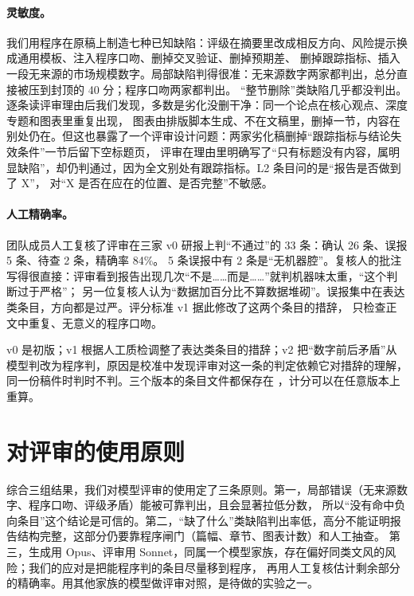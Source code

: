 \paragraph{灵敏度。}我们用程序在原稿上制造七种已知缺陷：评级在摘要里改成相反方向、风险提示换成通用模板、注入程序口吻、删掉交叉验证、删掉预期差、
删掉跟踪指标、插入一段无来源的市场规模数字。局部缺陷判得很准：无来源数字两家都判出，总分直接被压到封顶的 40 分；程序口吻两家都判出。
“整节删除”类缺陷几乎都没判出。逐条读评审理由后我们发现，多数是劣化没删干净：同一个论点在核心观点、深度专题和图表里重复出现，
图表由排版脚本生成、不在文稿里，删掉一节，内容在别处仍在。但这也暴露了一个评审设计问题：两家劣化稿删掉“跟踪指标与结论失效条件”一节后留下空标题页，
评审在理由里明确写了“只有标题没有内容，属明显缺陷”，却仍判通过，因为全文别处有跟踪指标。L2 条目问的是“报告是否做到了 X”，
对“X 是否在应在的位置、是否完整”不敏感。

\paragraph{人工精确率。}团队成员人工复核了评审在三家 v0 研报上判“不通过”的 33 条：确认 26 条、误报 5 条、待查 2 条，精确率 84\%。
5 条误报中有 2 条是“无机器腔”。复核人的批注写得很直接：评审看到报告出现几次“不是……而是……”就判机器味太重，“这个判断过于严格”；
另一位复核人认为“数据加百分比不算数据堆砌”。误报集中在表达类条目，方向都是过严。评分标准 v1 据此修改了这两个条目的措辞，
只检查正文中重复、无意义的程序口吻。

\begin{note}[评分标准的版本]
v0 是初版；v1 根据人工质检调整了表达类条目的措辞；v2 把“数字前后矛盾”从模型判改为程序判，原因是校准中发现评审对这一条的判定依赖它对措辞的理解，
同一份稿件时判时不判。三个版本的条目文件都保存在 ，计分可以在任意版本上重算。
\end{note}

\section{对评审的使用原则}

综合三组结果，我们对模型评审的使用定了三条原则。第一，局部错误（无来源数字、程序口吻、评级矛盾）能被可靠判出，且会显著拉低分数，
所以“没有命中负向条目”这个结论是可信的。第二，“缺了什么”类缺陷判出率低，高分不能证明报告结构完整，这部分仍要靠程序闸门（篇幅、章节、图表计数）和人工抽查。
第三，生成用 Opus、评审用 Sonnet，同属一个模型家族，存在偏好同类文风的风险；我们的应对是把能程序判的条目尽量移到程序，
再用人工复核估计剩余部分的精确率。用其他家族的模型做评审对照，是待做的实验之一。
